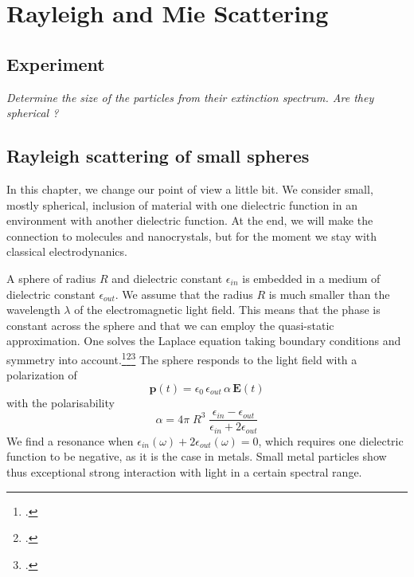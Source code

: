 

\chapter{Rayleigh and Mie Scattering}




\section{Experiment}

\textit{Determine the size of the particles from their extinction spectrum. Are they spherical ?
}


\section{Rayleigh scattering of small spheres}


In this chapter, we change our point of view a little bit. We consider small, mostly spherical, inclusion of material with one dielectric function in an environment with another dielectric function. At the end, we will make the connection to molecules and nanocrystals, but for the moment we stay with classical electrodynanics.


A sphere of radius $R$ and dielectric constant $\epsilon_{in}$ is embedded in a medium of dielectric constant $\epsilon_{out}$. We assume that the radius $R$ is much smaller than the wavelength $\lambda$ of the electromagnetic light field. This means that the phase is constant across the sphere and that we can employ the quasi-static approximation. One solves the Laplace equation taking  boundary conditions and symmetry into account.\footcite{Jackson-ED}\footcite[excercise 2.4.2]{Nolting-ED}\footcite[chapter 5.2]{BH-book}
The sphere responds to the light field with a polarization of
\[
 \mathbf{p}(t) = \epsilon_0 \,  \epsilon_{out} \, \alpha \, \mathbf{E}(t)
\]
with the polarisability
\[
 \alpha = 4 \pi  \; R^3 \; \frac{\epsilon_{in} - \epsilon_{out}}{\epsilon_{in} + 2 \epsilon_{out}}
\]
We find a resonance when $\epsilon_{in}(\omega) + 2 \epsilon_{out}(\omega) = 0$, which requires one dielectric function to be negative, as it is the case in metals. Small metal particles show thus exceptional strong interaction with light in a certain spectral range.

